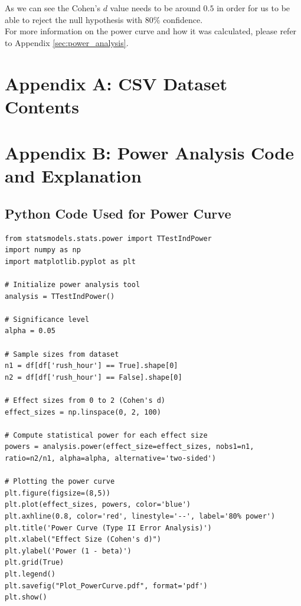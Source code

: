 \documentclass[a4paper, 10pt]{article}
\begin{document}
				\noindent As we can see the Cohen's $d$ value needs to be around $0.5$ in order for us to be able to reject the null 
				hypothesis with $80\%$ confidence. \\

				\noindent For more information on the power curve and how it was calculated, please refer to Appendix \ref{sec:power_analysis}.

	\appendix
	\label{sec:rawdata}
	\appendixpage 
	\addappheadtotoc
	\section*{Appendix A: CSV Dataset Contents}
	
	

	\newpage
	\appendix
	\label{sec:power_analysis}
	\section*{Appendix B: Power Analysis Code and Explanation}

		\subsection*{Python Code Used for Power Curve}
		\begin{verbatim}
from statsmodels.stats.power import TTestIndPower
import numpy as np
import matplotlib.pyplot as plt

# Initialize power analysis tool
analysis = TTestIndPower()

# Significance level
alpha = 0.05

# Sample sizes from dataset
n1 = df[df['rush_hour'] == True].shape[0]
n2 = df[df['rush_hour'] == False].shape[0]

# Effect sizes from 0 to 2 (Cohen's d)
effect_sizes = np.linspace(0, 2, 100)

# Compute statistical power for each effect size
powers = analysis.power(effect_size=effect_sizes, nobs1=n1, ratio=n2/n1, alpha=alpha, alternative='two-sided')

# Plotting the power curve
plt.figure(figsize=(8,5))
plt.plot(effect_sizes, powers, color='blue')
plt.axhline(0.8, color='red', linestyle='--', label='80% power')
plt.title('Power Curve (Type II Error Analysis)')
plt.xlabel("Effect Size (Cohen's d)")
plt.ylabel('Power (1 - beta)')
plt.grid(True)
plt.legend()
plt.savefig("Plot_PowerCurve.pdf", format='pdf')
plt.show()
		\end{verbatim}
\end{document}
